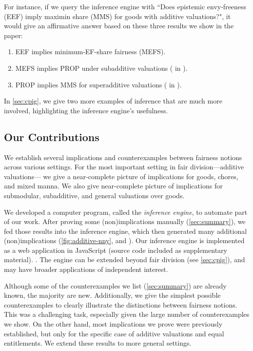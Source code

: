For instance, if we query the inference engine with
``Does epistemic envy-freeness (EEF\fairDefAgain{}) imply maximin share (MMS) for goods with additive valuations?",
it would give an affirmative answer based on these three results we show in the paper:
\begin{enumerate}
\item EEF implies minimum-EF-share fairness (MEFS\fairDefAgain{}).
\item MEFS implies PROP under subadditive valuations
    ( in ).
\item PROP implies MMS for superadditive valuations
    ( in ).
\end{enumerate}
In \cref{sec:cpig}, we give two more examples of inference that are much more involved,
highlighting the inference engine's usefulness.

\subsection{Our Contributions}

We establish several implications and counterexamples between fairness notions across various settings.
For the most important setting in fair division---additive valuations---%
we give a near-complete picture of implications for goods, chores, and mixed manna.
We also give near-complete picture of implications for submodular, subadditive, and general valuations over goods.

We developed a computer program, called the \emph{inference engine}, to automate part of our work.
After proving some (non)implications manually (\cref{sec:summary}),
we fed those results into the inference engine,
which then generated many additional (non)implications
(\cref{fig:additive-nny}, and \dagsRefP{}).
Our inference engine is implemented as a web application in JavaScript
\ifAnonymous
(source code included as supplementary material).
\else
\citep{cpigjsEku}.
\fi
The engine can be extended beyond fair division (see \cref{sec:cpig}),
and may have broader applications of independent interest.

Although some of the counterexamples we list (\cref{sec:summary}) are already known, the majority are new.
Additionally, we give the simplest possible counterexamples to clearly illustrate the distinctions between fairness notions.
This was a challenging task, especially given the large number of counterexamples we show.
On the other hand, most implications we prove were previously established,
but only for the specific case of additive valuations and equal entitlements.
We extend these results to more general settings.

